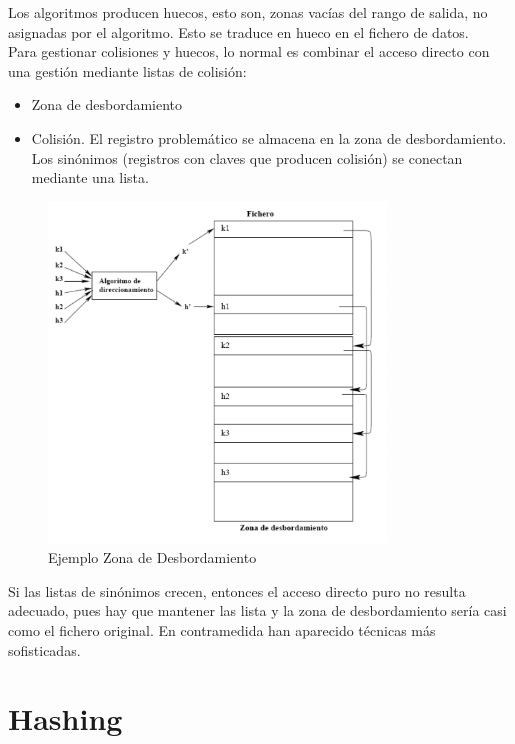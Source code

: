 \documentclass[a4paper,11pt]{article}
\begin{document}
Los algoritmos producen huecos, esto son, zonas vacías del rango de salida, no asignadas por el algoritmo. Esto se traduce en hueco en el fichero de datos. \\

Para gestionar colisiones y huecos, lo normal es combinar el acceso directo con una gestión mediante listas de colisión:

\begin{itemize}
\item Zona de desbordamiento

\item Colisión. El registro problemático se almacena en la zona de desbordamiento. Los sinónimos (registros con claves que producen colisión) se conectan mediante una lista.
\end{itemize}

\begin{figure}[h]
\centering
\caption{Ejemplo Zona de Desbordamiento}
\includegraphics[scale=1,width=0.8\textwidth]{zona_desbordamiento.png}
\end{figure}

Si las listas de sinónimos crecen, entonces el acceso directo puro no resulta adecuado, pues hay que mantener las lista y la zona de desbordamiento sería casi como el fichero original. En contramedida han aparecido técnicas más sofisticadas.

\section{Hashing}
\end{document}
